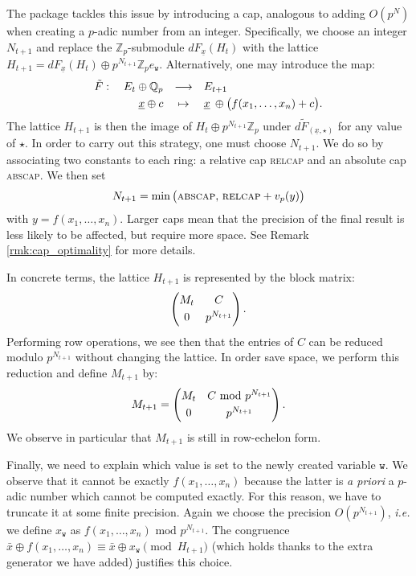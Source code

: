 \documentclass[sigconf]{acmart}
\newcommand{\Z}{\mathbb Z}
\newcommand{\Zp}{\Z_p}
\newcommand{\Q}{\mathbb Q}
\newcommand{\Qp}{\Q_p}
\newcommand{\ttw}{\texttt{w}\xspace}
\newcommand{\ZpLC}{\text{\color{output} \rm \tt ZpLC}\xspace}
\theoremstyle{definition}
\begin{document}
The package \ZpLC tackles this issue by introducing a cap, analogous
to adding $O(p^N)$ when creating a $p$-adic number from an integer.
Specifically, we choose an integer $N_{t+1}$ and replace the $\Zp$-submodule
$dF_{\underline x}(H_t)$ with the lattice $H_{t+1} = dF_{\underline x}(H_t) \oplus p^{N_{t+1}} \Zp e_\ttw$.
Alternatively, one may introduce the map:
\begin{equation}
\label{eq:tildeF}
\begin{array}{rcl}
\tilde F: \quad E_t \oplus \Qp & \longrightarrow & E_{t+1} \smallskip \\
\underline x \oplus c & \mapsto & \underline x \:\oplus 
\big(f(x_1, \ldots, x_n) + c\big).
\end{array}
\end{equation}
The lattice $H_{t+1}$ is then the image of $H_t \oplus p^{N_{t+1}}
\Zp$ under $d\tilde F_{(\underline x, \star)}$ for any value of $\star$.
In order to carry out this strategy, one must choose $N_{t+1}$.  We do
so by associating two constants to each ring: a relative cap \textsc{relcap}
and an absolute cap \textsc{abscap}. We then set
\begin{equation}
\label{eq:cap}
N_{t+1} = 
\min\big(\textsc{abscap},\, \textsc{relcap} + v_p(y)\big)
\end{equation}
with $y = f(x_1, \ldots, x_n)$.
Larger caps mean that the precision of the final result is less likely to be affected,
but require more space.  See Remark \ref{rmk:cap_optimality} for more details.

In concrete terms, the lattice $H_{t+1}$ is represented by the block 
matrix:
$$\left(\begin{matrix}
M_t & C \smallskip \\ 0 & p^{N_{t+1}}
\end{matrix}\right).$$
Performing row operations, we see then that the entries of $C$ can be
reduced modulo $p^{N_{t+1}}$ without changing the lattice. In order
save space, we perform this reduction and
define $M_{t+1}$ by:
$$M_{t+1} = \left(\begin{matrix}
M_t & C \text{ mod } p^{N_{t+1}} \smallskip \\ 0 & p^{N_{t+1}}
\end{matrix}\right).$$
We observe in particular that $M_{t+1}$ is still in row-echelon form.

Finally, we need to explain which value is set to the newly created 
variable $\ttw$. We observe that it cannot be exactly $f(x_1, \ldots, 
x_n)$ because the latter is \emph{a priori} a $p$-adic number which 
cannot be computed exactly. For this reason, we have to truncate it at 
some finite precision. Again we choose the precision $O(p^{N_{t+1}})$,
\emph{i.e.} we define $x_\ttw$ as $f(x_1, \ldots, x_n) \text{ mod } 
p^{N_{t+1}}$. 
The congruence
$\bar x \oplus f(x_1, \ldots, x_n) \equiv
\bar x \oplus x_\ttw \pmod{H_{t+1}}$
(which holds thanks to the extra generator we have added) justifies
this choice.
\end{document}
